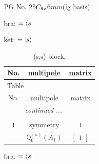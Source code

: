 \documentclass[fleqn,8pt,landscape]{jsarticle}
\begin{document}
\setcounter{MaxMatrixCols}{32}

\renewcommand{\tablename}{Table~}
\renewcommand{\figurename}{Figure~}
\begin{center}
\LARGE
PG No. 25\quad$C_{\rm 6v}$\quad$6mm$\quad[ hexagonal ] (lg basis)
\end{center}
bra: $=\bra{s}$

\noindent
ket: $=\ket{s}$
\renewcommand{\arraystretch}{1.6}
\begin{longtable}{ccc}
\caption{(s,s) block.}
 \\
 \hline \hline
No. & multipole & matrix \\ \hline \endfirsthead

\multicolumn{2}{l}{\tablename\ \thetable{}} \\
 \hline \hline
No. & multipole & matrix \\ \hline \endhead

 \hline \hline
\multicolumn{2}{r}{\footnotesize\it continued ...} \\ \endfoot

 \hline \hline
\multicolumn{2}{r}{} \\ \endlastfoot

$ 1 $ & $ \text{symmetry} $ & $ 1 $ \\
$  $ & $ \mathbb{Q}_{0}^{(a)}(A_{1}) $ & $ \begin{bmatrix} 1 \end{bmatrix} $ \\ \hline
\end{longtable}
bra: $=\bra{s}$
\end{document}
